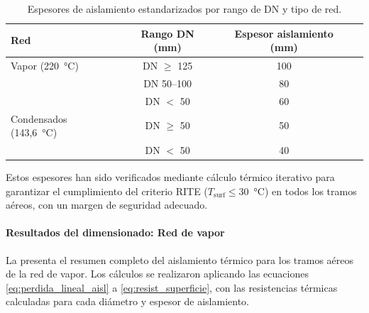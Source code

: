 \documentclass[12pt]{article}
\begin{document}
\begin{table}[htbp]
	\centering
	\caption{Espesores de aislamiento estandarizados por rango de DN y tipo de red.}
	\label{tab:rangos_estandarizados}
	\begin{tabular}{lccc}
		\toprule
		\textbf{Red}             & \textbf{Rango DN (mm)} & \textbf{Espesor aislamiento (mm)} \\
		\midrule
		Vapor (220~°C)           & DN $\geq$ 125          & 100                               \\
		                         & DN 50--100             & 80                                \\
		                         & DN $<$ 50              & 60                                \\
		\midrule
		Condensados (143{,}6~°C) & DN $\geq$ 50           & 50                                \\
		                         & DN $<$ 50              & 40                                \\
		\bottomrule
	\end{tabular}
\end{table}

Estos espesores han sido verificados mediante cálculo térmico iterativo para garantizar el cumplimiento del criterio RITE ($T_{\text{surf}} \leq 30$~°C) en todos los tramos aéreos, con un margen de seguridad adecuado.

\paragraph{Resultados del dimensionado: Red de vapor}
\label{par:resultados_vapor_aereo}

La  presenta el resumen completo del aislamiento térmico para los tramos aéreos de la red de vapor. Los cálculos se realizaron aplicando las ecuaciones \eqref{eq:perdida_lineal_aisl} a \eqref{eq:resist_superficie}, con las resistencias térmicas calculadas para cada diámetro y espesor de aislamiento.
\end{document}
